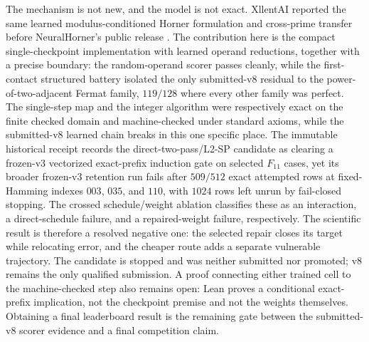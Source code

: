\documentclass[11pt]{article}
\begin{document}
The mechanism is not new, and the model is not exact. XllentAI reported the same
learned modulus-conditioned Horner formulation and cross-prime transfer before
NeuralHorner's public release \citep{xllent2026horner}. The contribution here is
the compact single-checkpoint implementation with learned operand reductions,
together with a precise boundary: the random-operand scorer passes cleanly, while
the first-contact structured battery
isolated the only submitted-v8 residual to the power-of-two-adjacent Fermat family, $119/128$
where every other family was perfect. The single-step map and the integer algorithm
were respectively exact on the finite checked domain and machine-checked under
standard axioms, while the submitted-v8 learned chain breaks in this one specific
place.
The immutable historical receipt records the direct-two-pass/L2-SP candidate as
clearing a frozen-v3 vectorized exact-prefix induction gate on selected $F_{11}$
cases, yet its broader frozen-v3 retention run
fails after $509/512$ exact attempted rows at fixed-Hamming indexes $003$, $035$,
and $110$, with $1024$ rows left unrun by fail-closed stopping. The crossed
schedule/weight ablation classifies these as an interaction, a direct-schedule
failure, and a repaired-weight failure, respectively. The scientific result is
therefore a resolved negative one: the selected repair closes its target while
relocating error, and the cheaper route adds a separate vulnerable trajectory.
The candidate is stopped and was neither submitted nor promoted; v8 remains the
only qualified submission. A proof connecting either trained cell to the
machine-checked step also remains open: Lean proves a conditional exact-prefix
implication, not the checkpoint premise and not the weights themselves. Obtaining
a final leaderboard result is the remaining gate between the submitted-v8 scorer
evidence and a final competition claim.
\end{document}
